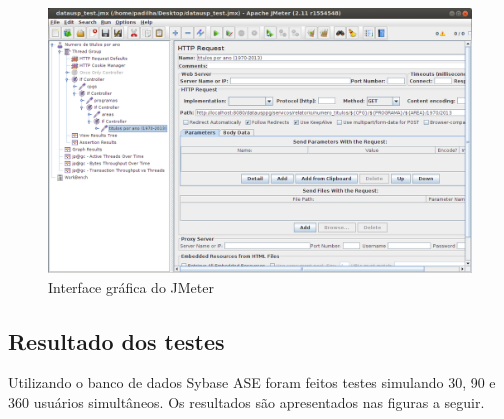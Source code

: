 \begin{figure}[H]
    \includegraphics[width=\textwidth]{figuras/jmeter}
    \caption{Interface gráfica do JMeter}
    \label{fig:jmeter}
\end{figure}

\subsection{Resultado dos testes}

Utilizando o banco de dados Sybase ASE foram feitos testes simulando 30, 90 e 360 usuários simultâneos. Os resultados são apresentados nas figuras a seguir.

